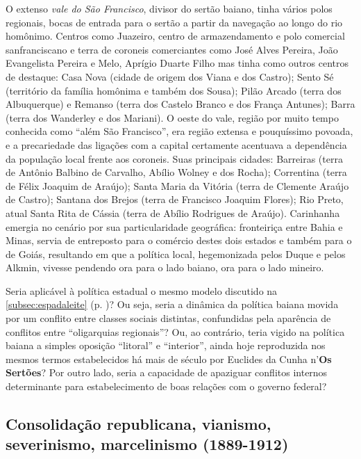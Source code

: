 O extenso \textit{vale do São Francisco}, divisor do sertão baiano, tinha vários polos regionais, bocas de entrada para o sertão a partir da navegação ao longo do rio homônimo. Centros como Juazeiro, centro de armazendamento e polo comercial sanfranciscano e terra de coroneis comerciantes como José Alves Pereira, João Evangelista Pereira e Melo, Aprígio Duarte Filho  mas tinha como outros centros de destaque: Casa Nova (cidade de origem dos Viana e dos Castro); Sento Sé (território da família homônima e também dos Sousa); Pilão Arcado (terra dos Albuquerque) e Remanso (terra dos Castelo Branco e dos França Antunes); Barra (terra dos Wanderley e dos Mariani). O oeste do vale, região por muito tempo conhecida como ``além São Francisco'', era região extensa e pouquíssimo povoada, e a precariedade das ligações com a capital certamente acentuava a dependência da população local frente aos coroneis. Suas principais cidades: Barreiras (terra de Antônio Balbino de Carvalho, Abílio Wolney e dos Rocha); Correntina (terra de Félix Joaquim de Araújo); Santa Maria da Vitória (terra de Clemente Araújo de Castro); Santana dos Brejos (terra de Francisco Joaquim Flores); Rio Preto, atual Santa Rita de Cássia (terra de Abílio Rodrigues de Araújo). Carinhanha emergia no cenário por sua particularidade geográfica: fronteiriça entre Bahia e Minas, servia de entreposto para o comércio destes dois estados e também para o de Goiás, resultando em que a política local, hegemonizada pelos Duque e pelos Alkmin, vivesse pendendo ora para o lado baiano, ora para o lado mineiro.

Seria aplicável à política estadual o mesmo modelo discutido na \autoref{subsec:espadaleite} (p. \pageref{subsec:espadaleite})? Ou seja, seria a dinâmica da política baiana movida por um conflito entre classes sociais distintas, confundidas pela aparência de conflitos entre ``oligarquias regionais''? Ou, ao contrário, teria vigido na política baiana a simples oposição ``litoral'' e ``interior'', ainda hoje reproduzida nos mesmos termos estabelecidos há mais de século por Euclides da Cunha n'\textbf{Os Sertões}? Por outro lado, seria a capacidade de apaziguar conflitos internos determinante para estabelecimento de boas relações com o governo federal?

\subsection{Consolidação republicana, vianismo, severinismo, marcelinismo (1889-1912)}

